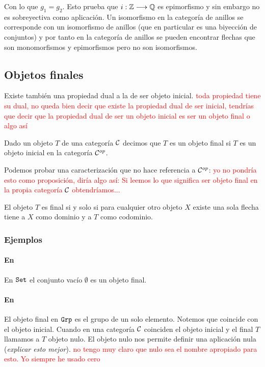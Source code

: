 Con lo que $g_1=g_2$. Esto prueba que $i : \mathbb{Z}\longrightarrow \mathbb{Q}$ es epimorfismo
y sin embargo no es sobreyectiva como aplicación. Un isomorfismo en
la categoría de anillos se corresponde con un isomorfismo de anillos
(que en particular es una biyección de conjuntos) y por tanto
en la categoría de anillos se pueden encontrar flechas que son
monomorfismos y epimorfismos pero no son isomorfismos.

\subsection{Objetos finales}
Existe también una propiedad dual a la de ser objeto inicial. \textcolor{red}{toda propiedad tiene su dual, no queda bien decir que existe la propiedad dual de ser inicial, tendrías que decir que la propiedad dual de ser un objeto inicial es ser un objeto final o algo así}

\begin{definition}
Dado un objeto $T$ de una categoría $\mathcal{C}$ decimos que
$T$ es un objeto final si $T$ es un objeto inicial en la
categoría $\mathcal{C}^{op}$.
\end{definition}

Podemos probar una caracterización que no hace referencia a
$\mathcal{C}^{op}$: \textcolor{red}{yo no pondría esto como proposición, diría algo así: Si leemos lo que significa ser objeto final en la propia categoría $\mathcal{C}$ obtendríamos...}

\begin{proposition}
El objeto $T$ es final si y solo si para cualquier otro objeto
$X$ existe una sola flecha tiene a $X$ como dominio y a $T$ como
codominio.
\end{proposition}

\subsubsection{Ejemplos}
\paragraph{En \Set}
En $\texttt{Set}$ el conjunto vacío $\emptyset$ es un objeto final.

\paragraph{En \Grp}

El objeto final en $\texttt{Grp}$ es el grupo de un solo elemento. Notemos
que coincide con el objeto inicial. Cuando en una categoría $\mathcal{C}$ coinciden
el objeto inicial y el final $T$ llamamos a $T$ objeto nulo. El objeto
nulo nos permite definir una aplicación nula (\textit{explicar esto mejor}). \textcolor{red}{no tengo muy claro que nulo sea el nombre apropiado para esto. Yo siempre he usado cero}

